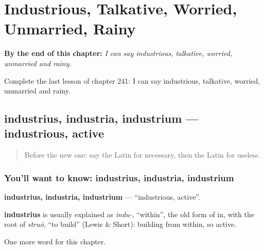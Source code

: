 
\chapter{Industrious, Talkative, Worried, Unmarried, Rainy}
\label{ch:la-industrious-talkative-worried-unmarried-rainy}

\begin{chapteropening}
\textbf{By the end of this chapter:} \emph{I can say industrious, talkative, worried, unmarried and rainy.}

Complete the last lesson of chapter 241: I can say industrious, talkative, worried, unmarried and rainy.
\end{chapteropening}

\section[industrius, industria, industrium]{industrius, industria, industrium — industrious, active}

\label{lesson:LA-C241-industrius}



\begin{quote}
Before the new one: say the Latin for necessary, then the Latin for useless.
\end{quote}

\subsection*{You'll want to know: industrius, industria, industrium}
\textbf{industrius, industria, industrium} — \textquotedblleft{}industrious, active\textquotedblright{}.

\begin{cousinweb}
\textbf{industrius} is usually explained as \emph{indu-}, \textquotedblleft{}within\textquotedblright{}, the old form of in, with the root of \emph{struō}, \textquotedblleft{}to build\textquotedblright{} (Lewis \& Short): building from within, so active.
\end{cousinweb}

\begin{grammarlens}[title={What you've built}]
One more word for this chapter.
\end{grammarlens}

